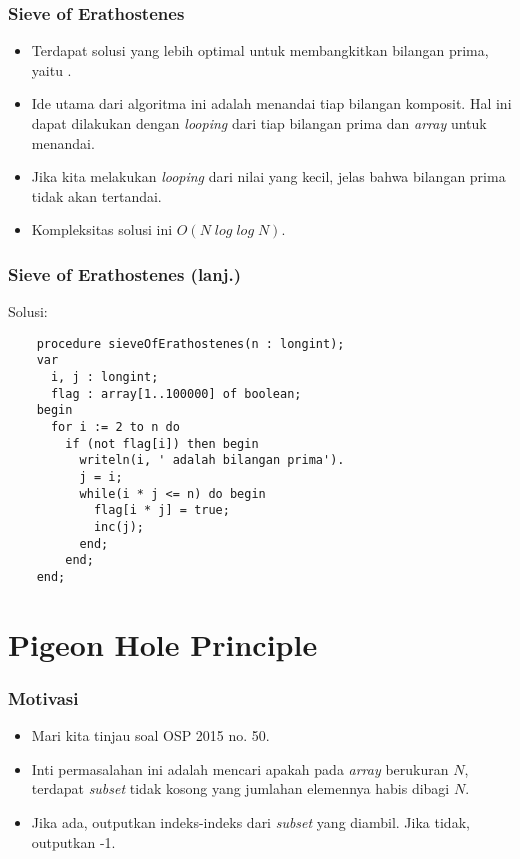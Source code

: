 \begin{frame}
\frametitle{Sieve of Erathostenes}
\begin{itemize}
  \item Terdapat solusi yang lebih optimal untuk membangkitkan bilangan prima, yaitu .
  \item Ide utama dari algoritma ini adalah menandai tiap bilangan komposit. Hal ini dapat dilakukan dengan \textit{looping} dari tiap bilangan prima dan \textit{array} untuk menandai.
  \item Jika kita melakukan \textit{looping} dari nilai yang kecil, jelas bahwa bilangan prima tidak akan tertandai.
  \item Kompleksitas solusi ini $O(N\;log\;log\;N)$.
\end{itemize}
\end{frame}

\begin{frame}[fragile]
\frametitle{Sieve of Erathostenes (lanj.)}
Solusi:
  \begin{lstlisting}
    procedure sieveOfErathostenes(n : longint);
    var
      i, j : longint;
      flag : array[1..100000] of boolean;
    begin
      for i := 2 to n do 
        if (not flag[i]) then begin
          writeln(i, ' adalah bilangan prima').
          j = i;
          while(i * j <= n) do begin
            flag[i * j] = true;
            inc(j);
          end;
        end;
    end;  
  \end{lstlisting}
\end{frame}

\section{Pigeon Hole Principle}
\frame{\sectionpage}

\begin{frame}
\frametitle{Motivasi}
\begin{itemize}
  \item Mari kita tinjau soal OSP 2015 no. 50.
  \item Inti permasalahan ini adalah mencari apakah pada \textit{array} berukuran $N$, terdapat \textit{subset} tidak kosong yang jumlahan elemennya habis dibagi $N$.
  \item Jika ada, outputkan indeks-indeks dari \textit{subset} yang diambil. Jika tidak, outputkan -1.
\end{itemize}
\end{frame}

